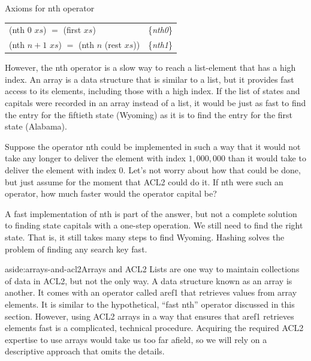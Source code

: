 \begin{center}
Axioms for \textsf{nth} operator
\begin{tabular}{ll}
\textsf{(nth 0} $xs$\textsf{)} $=$ \textsf{(first} $xs$\textsf{)}  & \{\emph{nth0}\}             \\
\textsf{(nth} $n+1$ $xs$\textsf{)} $=$ \textsf{(nth} $n$ \textsf{(rest} $xs$\textsf{))} & \{\emph{nth1}\} \\
\end{tabular}
\end{center}

However, the \textsf{nth} operator is a slow way to reach a
list-element that has a high index.
An array is a data structure that is
similar to a list, but it provides fast access to its
elements, including those with a high index.
If the list of states and capitals were recorded in an array instead
of a list, it would be just as fast to find the entry for the
fiftieth state (Wyoming) as it is to find the entry
for the first state (Alabama).

Suppose the operator \textsf{nth} could be implemented
in such a way that it would not take any longer to
deliver the element with index $1,000,000$ than it would take
to deliver the element with index $0$.
Let's not worry about how that could be done, but %
just assume for the moment that ACL2 could do it.
If \textsf{nth} were such an operator,
how much faster would the operator \textsf{capital} be?

A fast implementation of \textsf{nth} is part of the answer,
but not a complete solution to finding state capitals
with a one-step operation.
We still need to find the right state.
That is, it still takes many steps to find Wyoming.
Hashing solves the problem of finding any search key fast.

\begin{aside}{aside:arrays-and-acl2}{Arrays and ACL2}
Lists are one way to maintain collections of data in ACL2,
but not the only way. A data structure
known as an array is another. It comes with an operator
called \textsf{aref1} that retrieves values from array elements.
It is similar to the hypothetical, ``fast \textsf{nth}'' operator
discussed in this section. However, using ACL2 arrays in a way that
ensures that \textsf{aref1} retrieves elements fast
is a complicated, technical procedure.
Acquiring the required ACL2 expertise to use arrays
would take us too far afield, so we will rely on a
descriptive approach that omits the details.
\end{aside}

